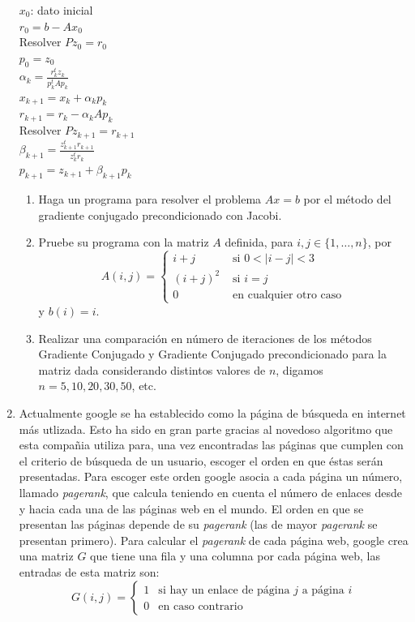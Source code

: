 \documentclass[12pt,letterpaper]{article}
\begin{document}
\begin{enumerate}
\begin{algorithm}[ht]
 $x_0$: dato inicial\\
 $r_0=b-Ax_0$\\
 Resolver $Pz_0=r_0$\\
 $p_0=z_0$\\
 {
  $\alpha_k=\displaystyle\frac{r_k^tz_k}{p_k^tAp_k}$\\
  $x_{k+1}=x_k+\alpha_kp_k$\\
  $r_{k+1}=r_k-\alpha_kAp_k$\\
  Resolver $Pz_{k+1}=r_{k+1}$\\
  $\beta_{k+1}=\displaystyle\frac{z_{k+1}^tr_{k+1}}{z_k^tr_k}$\\
  $p_{k+1}=z_{k+1}+\beta_{k+1}p_k$\\
 }
\end{algorithm}
\begin{enumerate}
 \item Haga un programa para resolver el problema $Ax = b$ por el m\'etodo del gradiente conjugado precondicionado con
Jacobi.
\item Pruebe su programa con la matriz $A$ definida, para $i,j \in \{1,\ldots, n\}$, por
$$
A(i,j) = \left\{\begin{array}{ll}
                 i+j & \mbox{ si } 0<|i-j|<3\\
                 (i+j)^2 &  \mbox{ si } i=j\\
                 0 & \mbox{ en cualquier otro caso}
                \end{array}
\right.
$$
y $b(i)=i$.
\item Realizar una comparaci\'on en n\'umero de iteraciones de los m\'etodos Gradiente Conjugado y Gradiente Conjugado
precondicionado para la matriz dada considerando distintos valores de $n$, digamos $n = 5, 10, 20, 30, 50$, etc.
\end{enumerate}

\item Actualmente google se ha establecido como la p\'agina de b\'usqueda en internet m\'as utlizada. Esto ha sido en gran parte gracias
al novedoso algoritmo que esta compa\~nia utiliza para, una vez encontradas las p\'aginas que cumplen con el criterio de b\'usqueda de
un usuario, escoger el orden en que \'estas ser\'an presentadas. Para escoger este orden google asocia a cada p\'agina un n\'umero, llamado
\textit{pagerank}, que calcula teniendo en cuenta el n\'umero de enlaces desde y hacia cada una de las p\'aginas web en el mundo. El orden
en que se presentan las p\'aginas depende de su \textit{pagerank} (las de mayor \textit{pagerank} se presentan primero). Para calcular el
\textit{pagerank} de cada p\'agina web, google crea una matriz $G$ que tiene una fila y una columna por cada p\'agina web, las entradas de
esta matriz son:
$$
G(i,j) = \left\{\begin{array}{ll}
                  1 & \mbox{si hay un enlace de p\'agina $j$ a p\'agina $i$}\\
		  0 & \mbox{en caso contrario}
                \end{array}
\right.
$$


\end{enumerate}
\end{document}
